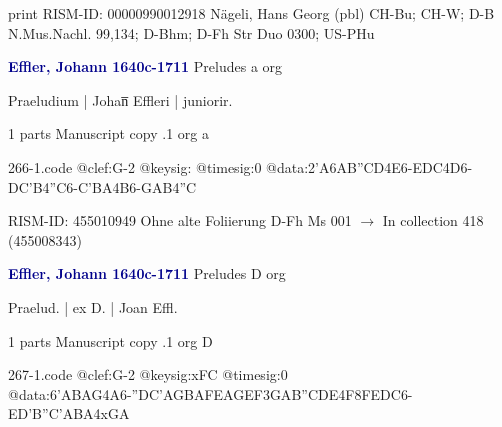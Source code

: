 \documentclass[twocolumn]{book}
\begin{document}
\newline print
\newline RISM-ID: 00000990012918
\newline Nägeli, Hans Georg  (pbl)
\newline CH-Bu; CH-W; D-B  N.Mus.Nachl. 99,134; D-Bhm; D-Fh  Str Duo 0300; US-PHu
\newline \par \vspace{7pt} \textcolor{darkblue}{\textbf{Effler, Johann  1640c-1711}}
\newline Preludes  a  
\newline org
\newline \begin{itshape}[f.74v, at left:] Praeludium | Johan̅ Effleri | juniorir.\end{itshape} 
\newline \textcolor{darkblue}{}  1 parts  
\newline Manuscript copy
.1  org  a  
\begin{filecontents*}{266-1.code}
@clef:G-2
@keysig:
@timesig:0
@data:2'A{6AB''CD}4E6-{EDC}4D6-{DC'B}4''C6-{C'BA}4B6-{GAB}4''C
\end{filecontents*}
\newline
%

\newline RISM-ID: 455010949
\newline Ohne alte Foliierung
\newline D-Fh  Ms 001
\newline $\rightarrow$ In collection 418 (455008343)

\newline \par \vspace{7pt} \textcolor{darkblue}{\textbf{Effler, Johann  1640c-1711}}
\newline Preludes  D  
\newline org
\newline \begin{itshape}[f.75r, at left:] Praelud. | ex D. | Joan Effl.\end{itshape} 
\newline \textcolor{darkblue}{}  1 parts  
\newline Manuscript copy
.1  org  D  
\begin{filecontents*}{267-1.code}
@clef:G-2
@keysig:xFC
@timesig:0
@data:{6'ABAG}4A6-{''DC'A}{GBAF}{EAGE}{F3GA}{B''CDE}4F{8FEDC}6-{ED'B}{''C'ABA}4xGA
\end{filecontents*}
\newline
%
\end{document}
